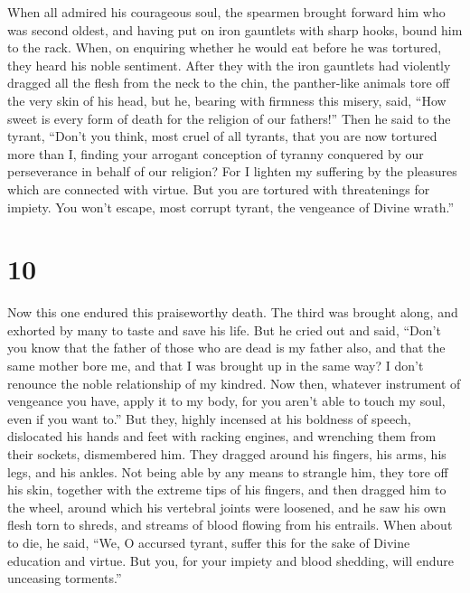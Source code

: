  When all admired his courageous soul, the spearmen brought
forward him who was second oldest, and having put on iron gauntlets with
sharp hooks, bound him to the rack.  When, on enquiring
whether he would eat before he was tortured, they heard his noble
sentiment.  After they with the iron gauntlets had
violently dragged all the flesh from the neck to the chin, the
panther-like animals tore off the very skin of his head, but he, bearing
with firmness this misery, said,  ``How sweet is every form
of death for the religion of our fathers!'' Then he said to the tyrant,
 ``Don't you think, most cruel of all tyrants, that you are
now tortured more than I, finding your arrogant conception of tyranny
conquered by our perseverance in behalf of our religion? 
For I lighten my suffering by the pleasures which are connected with
virtue.  But you are tortured with threatenings for
impiety. You won't escape, most corrupt tyrant, the vengeance of Divine
wrath.''

\hypertarget{section-9}{%
\section{10}\label{section-9}}

 Now this one endured this praiseworthy death. The third was
brought along, and exhorted by many to taste and save his life.
 But he cried out and said, ``Don't you know that the father
of those who are dead is my father also, and that the same mother bore
me, and that I was brought up in the same way?  I don't
renounce the noble relationship of my kindred.  Now then,
whatever instrument of vengeance you have, apply it to my body, for you
aren't able to touch my soul, even if you want to.''  But
they, highly incensed at his boldness of speech, dislocated his hands
and feet with racking engines, and wrenching them from their sockets,
dismembered him.  They dragged around his fingers, his arms,
his legs, and his ankles.  Not being able by any means to
strangle him, they tore off his skin, together with the extreme tips of
his fingers, and then dragged him to the wheel,  around
which his vertebral joints were loosened, and he saw his own flesh torn
to shreds, and streams of blood flowing from his entrails. 
When about to die, he said,  ``We, O accursed tyrant,
suffer this for the sake of Divine education and virtue. 
But you, for your impiety and blood shedding, will endure unceasing
torments.''

